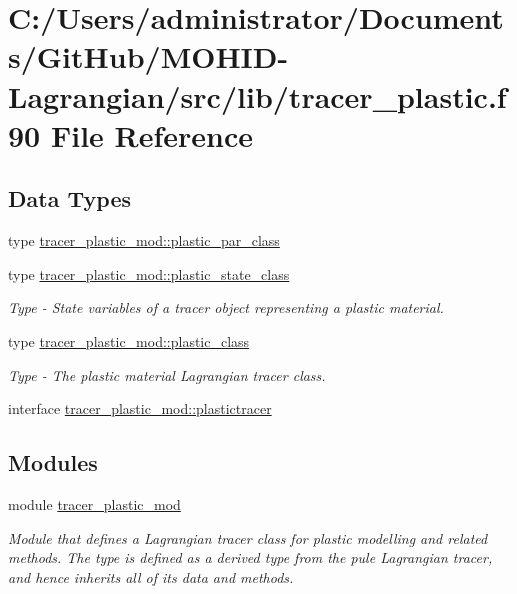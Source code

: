 \hypertarget{tracer__plastic_8f90}{}\section{C\+:/\+Users/administrator/\+Documents/\+Git\+Hub/\+M\+O\+H\+I\+D-\/\+Lagrangian/src/lib/tracer\+\_\+plastic.f90 File Reference}
\label{tracer__plastic_8f90}
\subsection*{Data Types}
\begin{DoxyCompactItemize}
\item 
type \mbox{\hyperlink{structtracer__plastic__mod_1_1plastic__par__class}{tracer\+\_\+plastic\+\_\+mod\+::plastic\+\_\+par\+\_\+class}}
\item 
type \mbox{\hyperlink{structtracer__plastic__mod_1_1plastic__state__class}{tracer\+\_\+plastic\+\_\+mod\+::plastic\+\_\+state\+\_\+class}}
\begin{DoxyCompactList}\small\item\em Type -\/ State variables of a tracer object representing a plastic material. \end{DoxyCompactList}\item 
type \mbox{\hyperlink{structtracer__plastic__mod_1_1plastic__class}{tracer\+\_\+plastic\+\_\+mod\+::plastic\+\_\+class}}
\begin{DoxyCompactList}\small\item\em Type -\/ The plastic material Lagrangian tracer class. \end{DoxyCompactList}\item 
interface \mbox{\hyperlink{interfacetracer__plastic__mod_1_1plastictracer}{tracer\+\_\+plastic\+\_\+mod\+::plastictracer}}
\end{DoxyCompactItemize}
\subsection*{Modules}
\begin{DoxyCompactItemize}
\item 
module \mbox{\hyperlink{namespacetracer__plastic__mod}{tracer\+\_\+plastic\+\_\+mod}}
\begin{DoxyCompactList}\small\item\em Module that defines a Lagrangian tracer class for plastic modelling and related methods. The type is defined as a derived type from the pule Lagrangian tracer, and hence inherits all of it\textquotesingle{}s data and methods. \end{DoxyCompactList}\end{DoxyCompactItemize}
